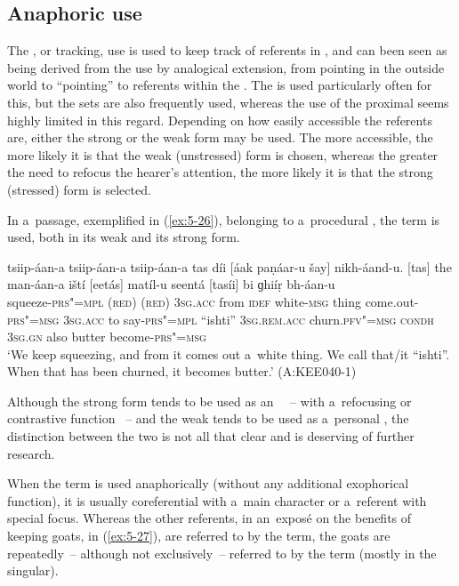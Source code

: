 \subsection{Anaphoric use}
\label{subsec:5-2-4}

The , or tracking, use is used to keep track of referents in , and can been seen as being derived from the  use by analogical extension, from pointing in the outside world to ``pointing'' to referents within the . The  is used particularly often for this, but the  sets are also frequently used, whereas the use of the proximal seems highly limited in this regard. Depending on how easily accessible the referents are, either the strong or the weak form may be used. The more accessible, the more likely it is that the weak (unstressed) form is chosen, whereas the greater the need to refocus the hearer's attention, the more likely it is that the strong (stressed) form is selected. 


In a~passage, exemplified in (\ref{ex:5-26}), belonging to a~procedural , the  term is used, both in its weak and its strong form.


\begin{exe}
\ex
\label{ex:5-26}
\gll tsiip-áan-a tsiip-áan-a tsiip-áan-a tas díi [áak paṇáar-u
 šay] nikh-áand-u. [tas] the man-áan-a iští [eetás] matíl-u
seentá [tasíi] bi ɡhiíṛ bh-áan-u \\
squeeze-\textsc{prs"=mpl} (\textsc{red}) (\textsc{red}) \textsc{3sg.acc} from
\textsc{idef} white-\textsc{msg} thing come.out-\textsc{prs"=msg} \textsc{3sg.acc}
to say-\textsc{prs"=mpl} ``ishti'' \textsc{3sg.rem.acc} churn.\textsc{pfv"=msg}
\textsc{condh} \textsc{3sg.gn} also butter become-\textsc{prs"=msg}\\
\glt `We keep squeezing, and from it comes out a~white thing. We call that/it ``ishti''. When that has been
churned, it becomes butter.' (A:KEE040-1)
\end{exe}

Although the strong form tends to be used as an~ ~-- with a~refocusing or contrastive function \citep[432]{diessel2006}~-- and the weak tends to be used as a~personal , the distinction between the two is not all that clear and is deserving of further research.

When the  term is used anaphorically (without any additional exophorical function), it is usually coreferential with a~main character or a~referent with special focus. Whereas the other referents, in an~exposé on the benefits of keeping goats, in (\ref{ex:5-27}), are referred to by the  term, the goats are repeatedly~-- although not exclusively~-- referred to by the  term (mostly in the singular). 

